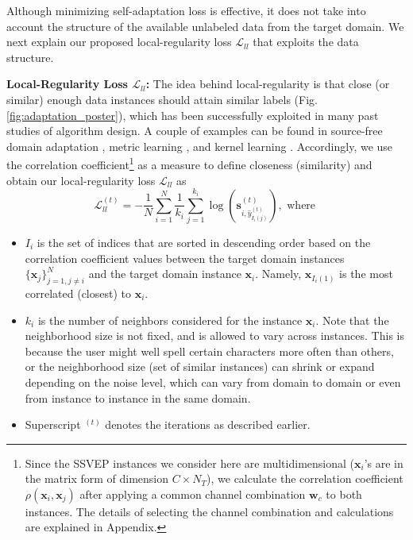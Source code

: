\documentclass[12pt]{iopart}
\newcommand{\matr}[1]{\mathbf{#1}}
\begin{document}
Although minimizing self-adaptation loss is effective, it does not take into account the structure of the available unlabeled data from the target domain. We next explain our proposed local-regularity loss $\mathcal{L}_{{ll}}$ that exploits the data structure.

{\bf Local-Regularity Loss $\mathcal{L}_{{ll}}$:} The idea behind local-regularity is that close (or similar) enough data instances should attain similar labels (Fig. \ref{fig:adaptation_poster}), which has been successfully exploited in many past studies of algorithm design. A couple of examples can be found in source-free domain adaptation \cite{shot_sfda,affinity_sfda}, metric learning \cite{kulis2012metric,massimino2018like}, and kernel learning \cite{gonen2011multiple}. Accordingly, we use the correlation coefficient\footnote{Since the SSVEP instances we consider here are multidimensional ($\matr{x}_i$'s are in the matrix form of dimension $C \times N_T$), we calculate the correlation coefficient $\rho(\matr{x}_i,\matr{x}_j)$ after applying a common channel combination $\matr{w}_{c}$ to both instances. The details of selecting the channel combination and calculations are explained in Appendix.} as a measure to define closeness (similarity) and obtain our local-regularity loss $\mathcal{L}_{{ll}}$ as
\begin{equation}
   \mathcal{L}_{{ll}}^{(t)} =-\frac{1}{N}\sum_{i=1}^{N}\frac{1}{k_i}\sum_{j=1}^{k_i} \log(\matr{s}_{i,\hat{y}_{I_i(j)}^{(t)}}^{(t)}), \text{ where }
   \label{eq:local_regularity_term}
\end{equation}

\begin{itemize}
\item $I_i$ is the set of indices that are sorted in descending order based on the correlation coefficient values between the target domain instances $\{\matr{x}_j\}_{j=1,j\neq i}^{N}$ and the target domain instance $\matr{x}_i$. Namely, $\matr{x}_{I_i(1)}$ is the most correlated (closest) to $\matr{x}_i$.
\item $k_i$ is the number of neighbors considered for the instance $\matr{x}_i$. Note that the neighborhood size is not fixed, and is allowed to vary across instances. This is because the user might well spell certain characters more often than others, or the neighborhood size (set of similar instances) can shrink or expand depending on the noise level, which can vary from domain to domain or even from instance to instance in the same domain.
\item Superscript $^{(t)}$ denotes the iterations as described earlier.
\end{itemize}
\end{document}
